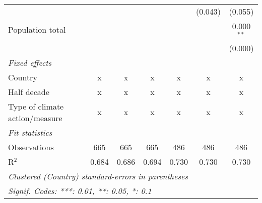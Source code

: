 \begin{tabular}{lcccccc}
                                                                                        &         &              &                &                & (0.043)        & (0.055)\\   
   Population total                                                                     &         &              &                &                &                & 0.000$^{**}$\\   
                                                                                        &         &              &                &                &                & (0.000)\\   
   \emph{Fixed effects}\\
   Country                                                                              & x       & x            & x              & x              & x              & x\\  
   Half decade                                                                          & x       & x            & x              & x              & x              & x\\  
   Type of climate action/measure                                                       & x       & x            & x              & x              & x              & x\\  
   \midrule \emph{Fit statistics}\\
   Observations                                                                         & 665     & 665          & 665            & 486            & 486            & 486\\  
   R$^2$                                                                                & 0.684   & 0.686        & 0.694          & 0.730          & 0.730          & 0.730\\  
   \midrule
   \multicolumn{7}{l}{\emph{Clustered (Country) standard-errors in parentheses}}\\
   \multicolumn{7}{l}{\emph{Signif. Codes: ***: 0.01, **: 0.05, *: 0.1}}\\
\end{tabular}
\par\endgroup


